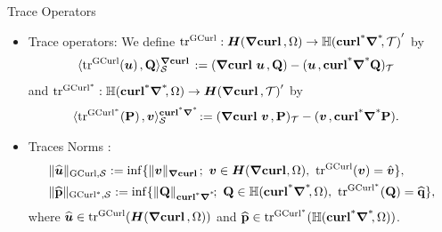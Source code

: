 \documentclass[10pt]{beamer}
\begin{document}
\begin{frame}{Trace Operators}
\begin{itemize}
\item Trace operators:
We define $\tracegc{}:\HGradCurl{\Omega} \to \HGradCurla{\cT}'$  by
\begin{align*}
&\dualgc{\tracegc{}(\bu)}{\QQ}_{\cS}:= \vdual{\GCurl\bu}{\QQ}-\vdual{\bu}{\GCurla \QQ}_{\cT}   
\end{align*}    
and  $\tra{}:\HGradCurla{\Omega} \to \HGradCurl{\cT}'$ by
\begin{align*}
&\dualgca{\tra{}(\PP)}{\bv}_{\cS}:= \vdual{\GCurl\bv}{\PP}_{\cT}-\vdual{\bv}{\GCurla \PP}.
\end{align*}
\item Traces Norms : 
\begin{align*}
&\|\tbu\|_{\tGCurl,\cS } := \inf \{\|\bv\|_{\Grad \Curl};~\bv \in \Hgcurl{\Omega},~\tracegc{}(\bv)=\tbv  \},  \\
&\|\tPP\|_{\tGCurla,\cS } : = \inf \{ \|\QQ\|_{\GCurla };~ \QQ \in \HGradCurla{\Omega},~\tra{}(\QQ)=\tQQ \},
\end{align*}
where $\tbu \in\tracegc{}(\HGradCurl{\Omega})$ and $\tPP \in \tra{}(\HGradCurla{\Omega})$.
\end{itemize}
\end{frame}
\end{document}
